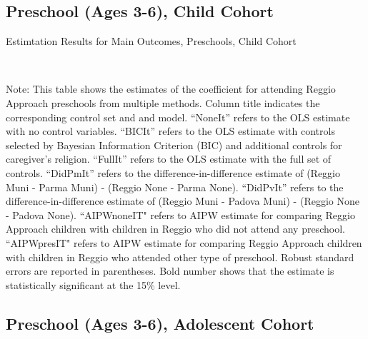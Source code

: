 


\subsection{Preschool (Ages 3-6), Child Cohort}

\begin{table}[H] \caption{Estimtation Results for Main Outcomes, Preschools, Child Cohort} \label{ols-M-child-reg}
\scalebox{0.9}{}
\vspace{1ex} \\
\footnotesize\raggedright{Note: This table shows the estimates of the coefficient for attending Reggio Approach preschools from multiple methods. Column title indicates the corresponding control set and and model. ``NoneIt'' refers to the OLS estimate with no control variables. ``BICIt'' refers to the OLS estimate with controls selected by Bayesian Information Criterion (BIC) and additional controls for caregiver's religion. ``FullIt'' refers to the OLS estimate with the full set of controls. ``DidPmIt'' refers to the difference-in-difference estimate of (Reggio Muni - Parma Muni) - (Reggio None - Parma None). ``DidPvIt'' refers to the difference-in-difference estimate of (Reggio Muni - Padova Muni) - (Reggio None - Padova None).  ``AIPWnoneIT" refers to AIPW estimate for comparing Reggio Approach children with children in Reggio who did not attend any preschool. ``AIPWpresIT" refers to AIPW estimate for comparing Reggio Approach children with children in Reggio who attended other type of preschool. Robust standard errors are reported in parentheses. Bold number shows that the estimate is statistically significant at the 15\% level.}

\end{table}



\subsection{Preschool (Ages 3-6), Adolescent Cohort}

